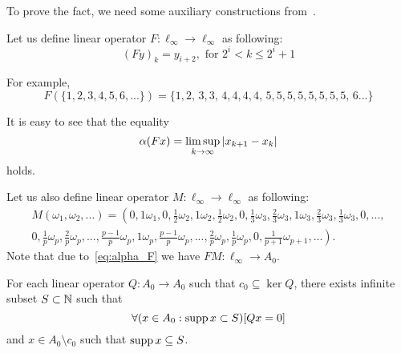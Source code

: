 To prove the fact, we need some auxiliary constructions from~\cite{our-vzms-2018}.


Let us define linear operator $F:\ell_\infty \to \ell_\infty$ as following:
\begin{equation}
	\label{operator_F}
	(Fy)_k = y_{i+2}, \mbox{ for } 2^i < k \leq 2^i+1
\end{equation}

For example,
$$
	F(\{1,2,3,4,5,6, ...\}) = \{1,2,\,3,3,\,4,4,4,4,\,5,5,5,5,5,5,5,5,\,6...\}
$$


It is easy to see that the equality
\begin{equation}
	\label{eq:alpha_F}
	\alpha(Fx) = \varlimsup_{k\to\infty} |x_{k+1} - x_{k}|
\end{equation}
holds.

Let us also define linear operator $M:\ell_\infty \to \ell_\infty$ as following:
\begin{multline*}
	M(\omega_1,\omega_2,...)=\left(
		0, 1\omega_1,
		0, \frac{1}{2}\omega_2, 1\omega_2, \frac{1}{2}\omega_2,
		0, \frac{1}{3}\omega_3, \frac{2}{3}\omega_3, 1\omega_3, \frac{2}{3}\omega_3, \frac{1}{3}\omega_3,
		0, ...,
	\right. \\ \left.
		0, \frac{1}{p}\omega_p, \frac{2}{p}\omega_p, ..., \frac{p-1}{p}\omega_p, 1\omega_p,
			\frac{p-1}{p}\omega_p, ..., \frac{2}{p}\omega_p, \frac{1}{p}\omega_p,
		0, \frac{1}{p+1}\omega_{p+1}, ...
	\right)
	.
\end{multline*}
Note that due to~\eqref{eq:alpha_F} we have $FM: \ell_\infty \to A_0$.


\begin{lemma}
	\label{lem:c_0_not_complemented_in_A_0}
	For each linear operator $Q: A_0 \to A_0$ such that $c_0\subseteq \ker Q$,
	there exists infinite subset $S \subset \mathbb{N}$ such that
	\begin{equation}
		\forall(x \in A_0 : \operatorname{supp} x \subset S)[Qx = 0]
	\end{equation}
	and $x\in A_0\setminus c_0$ such that $\operatorname{supp} x \subseteq S$.
\end{lemma}

